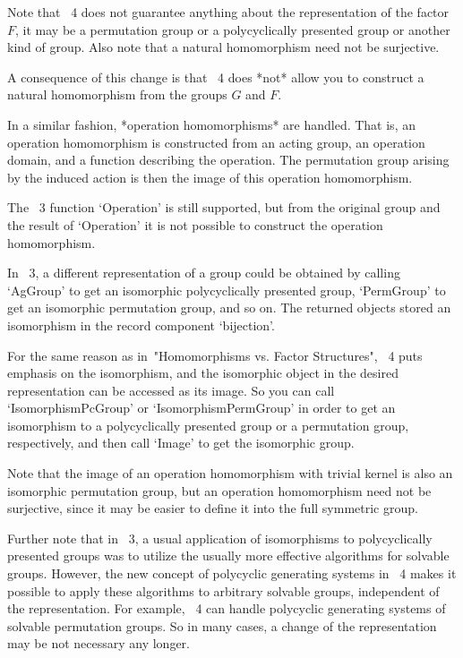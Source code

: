 Note that {\GAP}~4 does not guarantee anything about the representation
of the factor $F$, it may be a permutation group or a polycyclically
presented group or another kind of group.
Also note that a natural homomorphism need not be surjective.

A consequence of this change is that {\GAP}~4 does *not* allow you to
construct a natural homomorphism from the groups $G$ and $F$.

In a similar fashion, *operation homomorphisms* are handled.
That is, an operation homomorphism is constructed from an acting group,
an operation domain, and a function describing the operation.
The permutation group arising by the induced action is then the image
of this operation homomorphism.

The {\GAP}~3 function `Operation' is still supported,
but from the original group and the result of `Operation' it is not
possible to construct the operation homomorphism.



In {\GAP}~3, a different representation of a group could be obtained by
calling `AgGroup' to get an isomorphic polycyclically presented group,
`PermGroup' to get an isomorphic permutation group, and so on.
The returned objects stored an isomorphism in the record component
`bijection'.

For the same reason as in~"Homomorphisms vs. Factor Structures",
{\GAP}~4 puts emphasis on the isomorphism,
and the isomorphic object in the desired representation can be accessed
as its image.
So you can call `IsomorphismPcGroup' or `IsomorphismPermGroup' in order
to get an isomorphism to a polycyclically presented group or a
permutation group, respectively, and then call `Image' to get the
isomorphic group.

Note that the image of an operation homomorphism with trivial kernel is
also an isomorphic permutation group,
but an operation homomorphism need not be surjective,
since it may be easier to define it into the full symmetric group.

Further note that in {\GAP}~3, a usual application of isomorphisms to
polycyclically presented groups was to utilize the usually more effective
algorithms for solvable groups.
However, the new concept of polycyclic generating systems in {\GAP}~4
makes it possible to apply these algorithms to arbitrary solvable groups,
independent of the representation.
For example, {\GAP}~4 can handle polycyclic generating systems of
solvable permutation groups.
So in many cases, a change of the representation may be not necessary any
longer.

